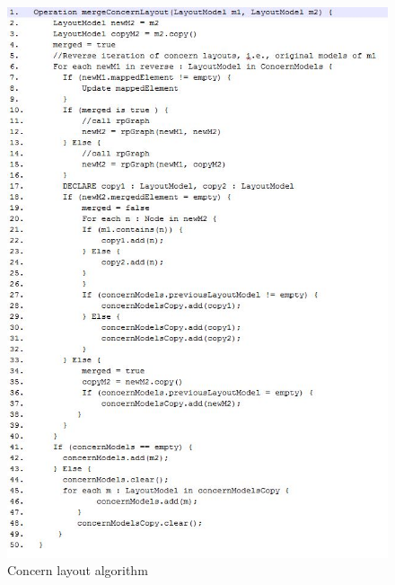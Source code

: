  \begin{figure}
	\centering
    \includegraphics[width=1\linewidth]{concernalgorithm.JPG}
    \caption{Concern layout algorithm}
    \label{fig : concern algorithm}
\end{figure}


